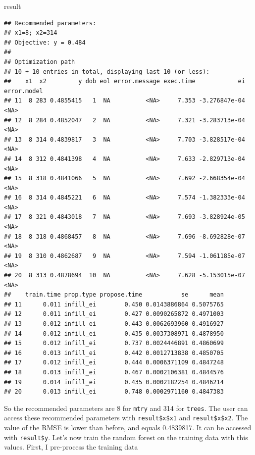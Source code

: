\documentclass[
]{article}
\newenvironment{Shaded}{\begin{snugshade}}{\end{snugshade}}
\newcommand{\NormalTok}[1]{#1}
\begin{document}
\begin{Shaded}
\begin{Highlighting}[]
\NormalTok{result}
\end{Highlighting}
\end{Shaded}

\begin{verbatim}
## Recommended parameters:
## x1=8; x2=314
## Objective: y = 0.484
## 
## Optimization path
## 10 + 10 entries in total, displaying last 10 (or less):
##    x1  x2         y dob eol error.message exec.time            ei error.model
## 11  8 283 0.4855415   1  NA          <NA>     7.353 -3.276847e-04        <NA>
## 12  8 284 0.4852047   2  NA          <NA>     7.321 -3.283713e-04        <NA>
## 13  8 314 0.4839817   3  NA          <NA>     7.703 -3.828517e-04        <NA>
## 14  8 312 0.4841398   4  NA          <NA>     7.633 -2.829713e-04        <NA>
## 15  8 318 0.4841066   5  NA          <NA>     7.692 -2.668354e-04        <NA>
## 16  8 314 0.4845221   6  NA          <NA>     7.574 -1.382333e-04        <NA>
## 17  8 321 0.4843018   7  NA          <NA>     7.693 -3.828924e-05        <NA>
## 18  8 318 0.4868457   8  NA          <NA>     7.696 -8.692828e-07        <NA>
## 19  8 310 0.4862687   9  NA          <NA>     7.594 -1.061185e-07        <NA>
## 20  8 313 0.4878694  10  NA          <NA>     7.628 -5.153015e-07        <NA>
##    train.time prop.type propose.time           se      mean
## 11      0.011 infill_ei        0.450 0.0143886864 0.5075765
## 12      0.011 infill_ei        0.427 0.0090265872 0.4971003
## 13      0.012 infill_ei        0.443 0.0062693960 0.4916927
## 14      0.012 infill_ei        0.435 0.0037308971 0.4878950
## 15      0.012 infill_ei        0.737 0.0024446891 0.4860699
## 16      0.013 infill_ei        0.442 0.0012713838 0.4850705
## 17      0.012 infill_ei        0.444 0.0006371109 0.4847248
## 18      0.013 infill_ei        0.467 0.0002106381 0.4844576
## 19      0.014 infill_ei        0.435 0.0002182254 0.4846214
## 20      0.013 infill_ei        0.748 0.0002971160 0.4847383
\end{verbatim}

So the recommended parameters are 8 for \texttt{mtry} and 314 for \texttt{trees}. The
user can access these recommended parameters with \texttt{result\$x\$x1} and \texttt{result\$x\$x2}.
The value of the RMSE is lower than before, and equals 0.4839817. It can be accessed with
\texttt{result\$y}.
Let's now train the random forest on the training data with this values. First, I pre-process the
training data
\end{document}
